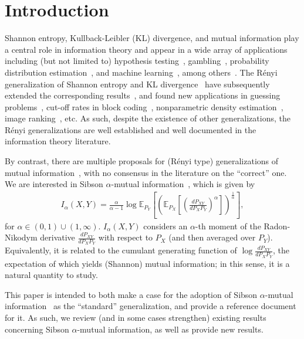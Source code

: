 \documentclass{article}
\numberwithin{theorem}{section}
\numberwithin{example}{section}
\numberwithin{remark}{section}
\numberwithin{definition}{section}
\newcommand{\E}{\mathbb{E}}
\newcommand{\range}{(0,1) \cup (1,\infty)}
\newcommand{\revised}[1]{{\color{black} #1}}
\begin{document}
\section{Introduction}


Shannon entropy, Kullback-Leibler (KL) divergence, and mutual information play a central role in information theory and appear in a wide array of applications including (but not limited to) hypothesis testing~\cite{chernoff:52}, gambling~\cite{kelly:56,latane:67}, probability distribution estimation~\cite{perez:2008}, and machine learning~\cite{tishby:2000}, among others~\cite{dembo:2009,cover:2006}. The R\'enyi generalization of Shannon entropy and KL divergence~\cite{renyi:61} have subsequently extended the corresponding results~\cite{renyiDiv}, and found new applications in guessing problems~\cite{arikan:96}, cut-off rates in block coding~\cite{csiszar:95}, nonparametric density estimation~\cite{vandegeer:93}, image ranking~\cite{hero:2002}, etc. As such, despite the existence of other generalizations, the R\'enyi generalizations are well established and well documented in the information theory literature.

By contrast, there are multiple proposals for (R\'enyi type) generalizations of mutual information~\cite{Sibson:69,arimoto:77,csiszar:95,verdu:2015,lapidothP:2019}, with no consensus in the literature on the ``correct'' one. We are interested in Sibson $\alpha$-mutual information~\cite{Sibson:69}, which is given by 
\begin{align}
    \label{eq:Sibson-Intro}
    I_\alpha(X,Y) =  \frac{\alpha}{\alpha-1} \log \E_{P_Y} \left[\left(\E_{P_X}\left[\left(\frac{dP_{XY}}{dP_XP_Y}\right)^\alpha\right]\right)^\frac{1}{\alpha}\right],
\end{align}
for $\alpha \in \range$. $I_\alpha(X,Y)$ considers an $\alpha$-th moment of the Radon-Nikodym derivative $ \frac{dP_{XY}}{dP_XP_Y}$ \revised{with respect to $P_X$ (and then averaged over $P_Y$)}. Equivalently, it is related to the cumulant generating function of $ \log \frac{dP_{XY}}{dP_XP_Y}$, the expectation of which yields (Shannon) mutual information; in this sense, it is a natural quantity to study.

This paper is intended to both make a case for the adoption of Sibson $\alpha$-mutual information~\cite{Sibson:69} as the ``standard'' generalization, and provide a reference document for it.  As such, we review (and in some cases strengthen) existing results concerning Sibson $\alpha$-mutual information, as well as provide new results.  
\end{document}
